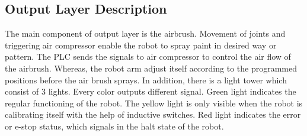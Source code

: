 \subsection{Output Layer Description}

The main component of output layer is the airbrush. Movement of joints and triggering air compressor enable the robot to spray paint in desired way or pattern. The PLC sends the signals to air compressor to control the air flow of the airbrush. Whereas, the robot arm adjust itself according to the programmed positions before the air brush sprays. In addition, there is a light tower which consist of 3 lights. Every color outputs different signal. Green light indicates the regular functioning of the robot. The yellow light is only visible when the robot is calibrating itself with the help of inductive switches. Red light indicates the error or e-stop status, which signals in the halt state of the robot.


